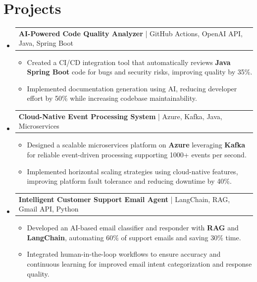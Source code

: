 \documentclass[letterpaper,11pt]{article}
\makeatletter
\newcommand{\resumeItem}[1]{
  \item\footnotesize{
    {#1 \vspace{-2pt}}
  }
}
\newcommand{\resumeProjectHeading}[2]{
    \item
    \begin{tabular*}{1.001\textwidth}{l@{\extracolsep{\fill}}r}
      \small#1 & \textbf{\small #2}\\
    \end{tabular*}\vspace{-7pt}
}
\newcommand{\resumeSubHeadingListStart}{\begin{itemize}[leftmargin=0pt, label={}]}
\newcommand{\resumeSubHeadingListEnd}{\end{itemize}}
\newcommand{\resumeItemListStart}{\begin{itemize}[leftmargin=*]}
\newcommand{\resumeItemListEnd}{\end{itemize}\vspace{-5pt}}
\makeatother
\begin{document}
\section{Projects}
    \vspace{-5pt}
    \resumeSubHeadingListStart
          \resumeProjectHeading
              {\textbf{AI-Powered Code Quality Analyzer} | GitHub Actions, OpenAI API, Java, Spring Boot}{}
        \resumeItemListStart
            \resumeItem{Created a CI/CD integration tool that automatically reviews \textbf{Java Spring Boot} code for bugs and security risks, improving quality by 35\%.}
            \resumeItem{Implemented documentation generation using AI, reducing developer effort by 50\% while increasing codebase maintainability.}
        \resumeItemListEnd
        \vspace{-12pt}
    
    \resumeProjectHeading
        {\textbf{Cloud-Native Event Processing System} | Azure, Kafka, Java, Microservices}{}
        \resumeItemListStart
            \resumeItem{Designed a scalable microservices platform on \textbf{Azure} leveraging \textbf{Kafka} for reliable event-driven processing supporting 1000+ events per second.}
            \resumeItem{Implemented horizontal scaling strategies using cloud-native features, improving platform fault tolerance and reducing downtime by 40\%.}
        \resumeItemListEnd
          \vspace{-12pt}
    \resumeProjectHeading
        {\textbf{Intelligent Customer Support Email Agent} | LangChain, RAG, Gmail API, Python}{}
        \resumeItemListStart
            \resumeItem{Developed an AI-based email classifier and responder with \textbf{RAG} and \textbf{LangChain}, automating 60\% of support emails and saving 30\% time.}
            \resumeItem{Integrated human-in-the-loop workflows to ensure accuracy and continuous learning for improved email intent categorization and response quality.}
        \resumeItemListEnd 
    \resumeSubHeadingListEnd
\end{document}
